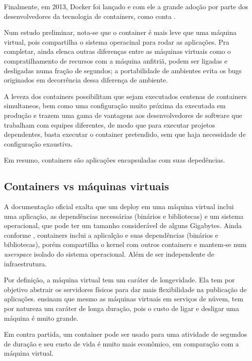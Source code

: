 \documentclass[
	12pt,				%
	openright,			%
	oneside,			%
	a4paper,			%
	chapter=TITLE,		%
	section=TITLE,		%
	english,			%
	french,				%
	spanish,			%
	brazil				%
	]{abntex2}
\begin{document}
Finalmente, em 2013, Docker foi lançado e com ele a grande adoção por parte dos desenvolvedores da tecnologia de containers, como conta .

Num estudo preliminar, nota-se que o container é mais leve que uma máquina virtual, pois compartilha o sistema operacinal para rodar as aplicações. Pra completar, ainda elenca outras diferenças entre as máquinas virtuais como o compratilhamento de recursos com a máquina anfitriã, podem ser ligadas e desligadas numa fração de segundos; a portabilidade de ambientes evita os bugs originados em decorrência dessa diferença de ambiente.

A leveza dos containers possibilitam que sejam executados centenas de containers simultaneos, bem como uma configuração muito próxima da executada em produção e trazem uma gama de vantagens aos desenvolvedores de software que trabalham com equipes diferentes, de modo que para executar projetos dependentes, basta executar o container pretendido, sem que haja necessidade de configuração exaustiva.

Em resumo, containers são aplicações encapsuladas com suas depedências.

\subsection{Containers vs máquinas virtuais}

A documentação oficial exalta que um deploy em uma máquina virtual inclui uma aplicação, as dependências necessárias (binários e bibliotecas) e um sistema operacional, que pode ter um tamanho considerável de alguns Gigabytes. Ainda conforme , containers inclui a aplicalção e suas dependências (binários e bibliotecas), porém compartilha o kernel com outros containers e mantem-se num \textit{userspace} isolado do sistema operacional. Além de ser independente de infraestrutura.

Por definição, a máquina virtual tem um caráter de longevidade. Ela tem por objetivo abstrair os servidores físicos para dar mais flexibilidade na publicação de aplicações.  ensinam que mesmo as máquinas virtuais em serviços de núvem, tem por natureza um caráter de longa duração, pois o custo de ligar e desligar uma máquina é muito grande.

Em contra partida, um container pode ser usado para uma atividade de segundos de duração e seu custo de vida é muito mais econômico, em comparação com a máquina virtual.
\end{document}
